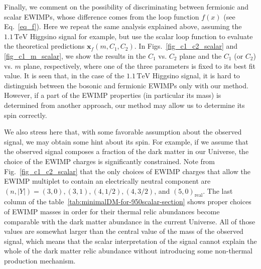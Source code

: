 \documentclass[12pt, a4paper]{article}
\begin{document}
Finally, we comment on the possibility of discriminating between
fermionic and scalar EWIMPs, whose difference comes from the loop
function $f(x)$ (see Eq.~\eqref{eq_f}).  Here we repeat the same
analysis explained above, assuming the $1.1\,\mathrm{TeV}$ Higgsino
signal for example, but use the scalar loop function to evaluate the
theoretical predictions $\bm{x}_f (m, C_1, C_2)$.  In
Figs.~\ref{fig_c1_c2_scalar} and \ref{fig_c1_m_scalar}, we show the
results in the $C_1$ vs. $C_2$ plane and the $C_1$ (or $C_2$) vs. $m$
plane, respectively, where one of the three parameters is fixed to its
best fit value.  It is seen that, in the case of the
$1.1\,\mathrm{TeV}$ Higgsino signal, it is hard to distinguish between
the bosonic and fermionic EWIMPs only with our method.  However, if a
part of the EWIMP properties (in particular its mass) is determined
from another approach, our method may allow us to determine its spin
correctly.

We also stress here that, with some favorable assumption about the
observed signal, we may obtain some hint about its spin.  For example,
if we assume that the observed signal composes a fraction of the dark
matter in our Universe, the choice of the EWIMP charges is
significantly constrained.  Note from Fig.~\ref{fig_c1_c2_scalar} that
the only choices of EWIMP charges that allow the EWIMP multiplet to
contain an electrically neutral component are
$(n,|Y|)=(3,0),(3,1),(4,1/2),(4,3/2)$, and $(5,0)_\text{real}$.  The
last column of the table~\ref{tab:minimalDM-for-950scalar-section} shows proper choices of EWIMP masses in order
for their thermal relic abundances become comparable with the dark
matter abundance in the current Universe.  All of those values are
somewhat larger than the central value of the mass of the observed
signal, which means that the scalar interpretation of the signal
cannot explain the whole of the dark matter relic abundance without
introducing some non-thermal production mechanism.
\end{document}
